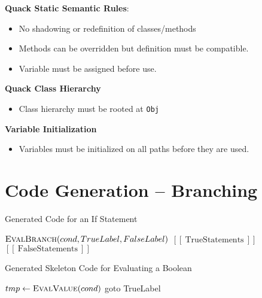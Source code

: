 \documentclass[10pt,twocolumn]{report}
\begin{document}
  \textbf{Quack Static Semantic Rules}:
  \begin{itemize}
    \item No shadowing or redefinition of classes/methods
    \item Methods can be overridden but definition must be compatible.
    \item Variable must be assigned before use.
  \end{itemize}

  \textbf{Quack Class Hierarchy}
  \begin{itemize}
    \item Class hierarchy must be rooted at \texttt{Obj}
  \end{itemize}

  \textbf{Variable Initialization}
  \begin{itemize}
    \item Variables must be initialized on all paths before they are used.
  \end{itemize}

\section{Code Generation -- Branching}

  \begin{algorithm}[h]
    \caption{Generated Code for an If Statement}
    \begin{algorithmic}[1]
      \State  $\Call{EvalBranch}{cond, TrueLabel, FalseLabel}$
      \State  {}
      \Indent
      \State    $\left[\left[~\textrm{TrueStatements}~\right]\right]$
      \State    {}
      \EndIndent
      \State  {}
      \Indent
      \State    $\left[\left[~\textrm{FalseStatements}~\right]\right]$
      \EndIndent
      \State  {}
      \EndProcedure
    \end{algorithmic}
  \end{algorithm}

  \begin{algorithm}[H]
    \caption{Generated Skeleton Code for Evaluating a Boolean}
    \begin{algorithmic}[1]
      \State $tmp \gets \Call{EvalValue}{cond}$
       goto TrueLabel \EndIf
      \State {}
      \EndProcedure
    \end{algorithmic}
  \end{algorithm}
\end{document}
